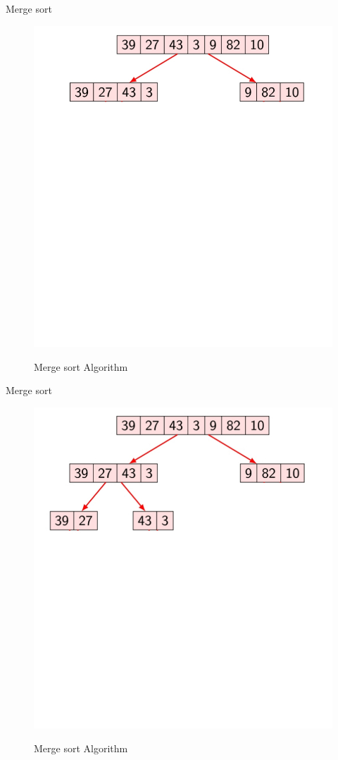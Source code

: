 \documentclass{beamer}
\begin{document}
\begin{frame}{Merge sort}
	\begin{figure}[h]
		\centering
		\includegraphics[scale=0.24]{IKEHS2.jpg}
		\label{fig:2}
		\caption{Merge sort Algorithm}
	\end{figure}
\end{frame}

\begin{frame}{Merge sort}
	\begin{figure}[h]
		\centering
		\includegraphics[scale=0.24]{IKEHS3.jpg}
		\label{fig:2}
		\caption{Merge sort Algorithm}
	\end{figure}
\end{frame}
\end{document}
